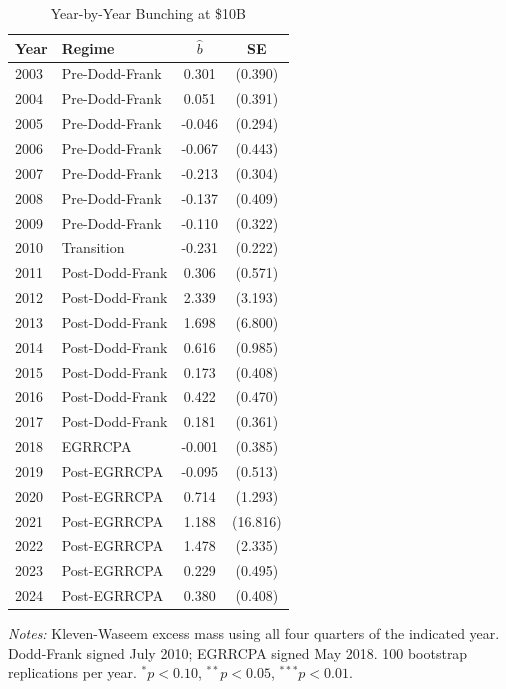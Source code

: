 \begin{table}[htbp]
\centering
\begin{threeparttable}
\caption{Year-by-Year Bunching at \$10B}
\label{tab:yearly}
\begin{tabular}{llcc}
\toprule
Year & Regime & $\hat{b}$ & SE \\
\midrule
2003 & Pre-Dodd-Frank & 0.301 & (0.390) \\
2004 & Pre-Dodd-Frank & 0.051 & (0.391) \\
2005 & Pre-Dodd-Frank & -0.046 & (0.294) \\
2006 & Pre-Dodd-Frank & -0.067 & (0.443) \\
2007 & Pre-Dodd-Frank & -0.213 & (0.304) \\
2008 & Pre-Dodd-Frank & -0.137 & (0.409) \\
2009 & Pre-Dodd-Frank & -0.110 & (0.322) \\
2010 & Transition & -0.231 & (0.222) \\
2011 & Post-Dodd-Frank & 0.306 & (0.571) \\
2012 & Post-Dodd-Frank & 2.339 & (3.193) \\
2013 & Post-Dodd-Frank & 1.698 & (6.800) \\
2014 & Post-Dodd-Frank & 0.616 & (0.985) \\
2015 & Post-Dodd-Frank & 0.173 & (0.408) \\
2016 & Post-Dodd-Frank & 0.422 & (0.470) \\
2017 & Post-Dodd-Frank & 0.181 & (0.361) \\
2018 & EGRRCPA & -0.001 & (0.385) \\
2019 & Post-EGRRCPA & -0.095 & (0.513) \\
2020 & Post-EGRRCPA & 0.714 & (1.293) \\
2021 & Post-EGRRCPA & 1.188 & (16.816) \\
2022 & Post-EGRRCPA & 1.478 & (2.335) \\
2023 & Post-EGRRCPA & 0.229 & (0.495) \\
2024 & Post-EGRRCPA & 0.380 & (0.408) \\
\bottomrule
\end{tabular}
\begin{tablenotes}[flushleft]
\small
\item \textit{Notes:} Kleven-Waseem excess mass using all four quarters of the indicated year. Dodd-Frank signed July 2010; EGRRCPA signed May 2018. 100 bootstrap replications per year. $^{*}p<0.10$, $^{**}p<0.05$, $^{***}p<0.01$.
\end{tablenotes}
\end{threeparttable}
\end{table}
